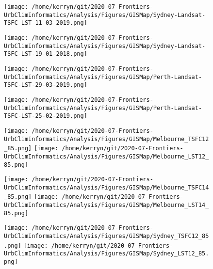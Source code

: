 \documentclass{article}
\begin{document}
\begin{figure}
\centering    
\texttt{[image: /home/kerryn/git/2020-07-Frontiers-UrbClimInformatics/Analysis/Figures/GISMap/Sydney-Landsat-TSFC-LST-11-03-2019.png]}
\end{figure} 
\clearpage


\begin{figure}
\centering    
\texttt{[image: /home/kerryn/git/2020-07-Frontiers-UrbClimInformatics/Analysis/Figures/GISMap/Sydney-Landsat-TSFC-LST-19-01-2018.png]}
\end{figure} 
\clearpage

\begin{figure}
\centering    
\texttt{[image: /home/kerryn/git/2020-07-Frontiers-UrbClimInformatics/Analysis/Figures/GISMap/Perth-Landsat-TSFC-LST-29-03-2019.png]}
\end{figure} 
\clearpage


\begin{figure}
\centering    
\texttt{[image: /home/kerryn/git/2020-07-Frontiers-UrbClimInformatics/Analysis/Figures/GISMap/Perth-Landsat-TSFC-LST-25-02-2019.png]}
\end{figure} 
\clearpage


\begin{figure}
\centering    
\texttt{[image: /home/kerryn/git/2020-07-Frontiers-UrbClimInformatics/Analysis/Figures/GISMap/Melbourne\_TSFC12\_85.png]}
\texttt{[image: /home/kerryn/git/2020-07-Frontiers-UrbClimInformatics/Analysis/Figures/GISMap/Melbourne\_LST12\_85.png]}
\end{figure} 
\clearpage


\begin{figure}
\centering    
\texttt{[image: /home/kerryn/git/2020-07-Frontiers-UrbClimInformatics/Analysis/Figures/GISMap/Melbourne\_TSFC14\_85.png]}
\texttt{[image: /home/kerryn/git/2020-07-Frontiers-UrbClimInformatics/Analysis/Figures/GISMap/Melbourne\_LST14\_85.png]}
\end{figure} 
\clearpage



\begin{figure}
\centering    
\texttt{[image: /home/kerryn/git/2020-07-Frontiers-UrbClimInformatics/Analysis/Figures/GISMap/Sydney\_TSFC12\_85.png]}
\texttt{[image: /home/kerryn/git/2020-07-Frontiers-UrbClimInformatics/Analysis/Figures/GISMap/Sydney\_LST12\_85.png]}
\end{figure} 
\clearpage
\end{document}
